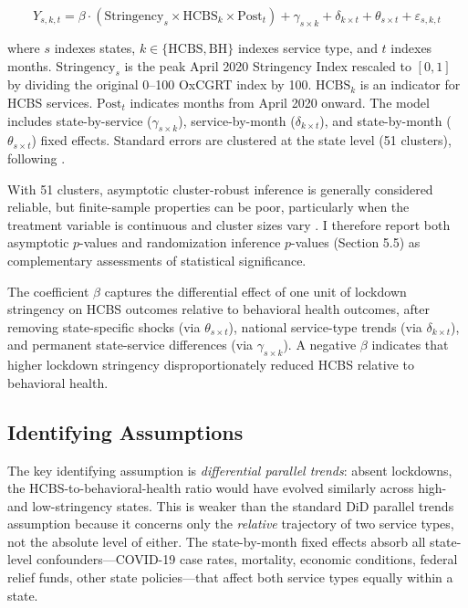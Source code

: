 \documentclass[12pt]{article}
\begin{document}
\begin{equation}
Y_{s,k,t} = \beta \cdot (\text{Stringency}_s \times \text{HCBS}_k \times \text{Post}_t) + \gamma_{s \times k} + \delta_{k \times t} + \theta_{s \times t} + \varepsilon_{s,k,t}
\label{eq:ddd}
\end{equation}

\noindent where $s$ indexes states, $k \in \{\text{HCBS}, \text{BH}\}$ indexes service type, and $t$ indexes months. $\text{Stringency}_s$ is the peak April 2020 Stringency Index rescaled to $[0,1]$ by dividing the original 0--100 OxCGRT index by 100. $\text{HCBS}_k$ is an indicator for HCBS services. $\text{Post}_t$ indicates months from April 2020 onward. The model includes state-by-service ($\gamma_{s \times k}$), service-by-month ($\delta_{k \times t}$), and state-by-month ($\theta_{s \times t}$) fixed effects. Standard errors are clustered at the state level (51 clusters), following \citet{cameron2008bootstrap}.

With 51 clusters, asymptotic cluster-robust inference is generally considered reliable, but finite-sample properties can be poor, particularly when the treatment variable is continuous and cluster sizes vary \citep{roodman2019fast}. I therefore report both asymptotic $p$-values and randomization inference $p$-values (Section 5.5) as complementary assessments of statistical significance.

The coefficient $\beta$ captures the differential effect of one unit of lockdown stringency on HCBS outcomes relative to behavioral health outcomes, after removing state-specific shocks (via $\theta_{s \times t}$), national service-type trends (via $\delta_{k \times t}$), and permanent state-service differences (via $\gamma_{s \times k}$). A negative $\beta$ indicates that higher lockdown stringency disproportionately reduced HCBS relative to behavioral health.

\subsection{Identifying Assumptions}

The key identifying assumption is \textit{differential parallel trends}: absent lockdowns, the HCBS-to-behavioral-health ratio would have evolved similarly across high- and low-stringency states. This is weaker than the standard DiD parallel trends assumption because it concerns only the \textit{relative} trajectory of two service types, not the absolute level of either. The state-by-month fixed effects absorb all state-level confounders---COVID-19 case rates, mortality, economic conditions, federal relief funds, other state policies---that affect both service types equally within a state.
\end{document}
